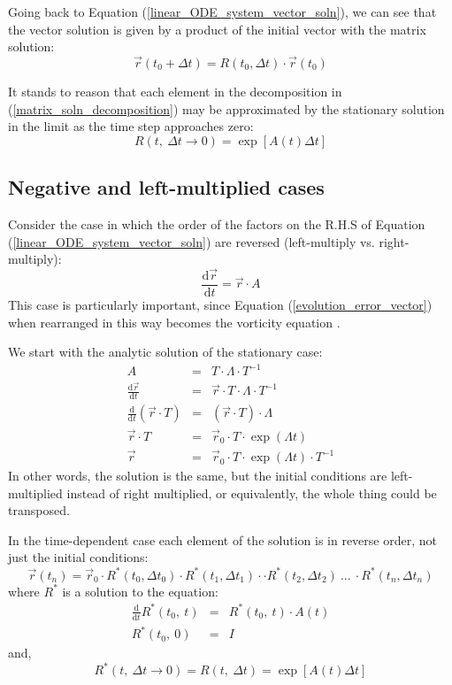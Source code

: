 \documentclass[11pt]{article}
\begin{document}
Going back to Equation (\ref{linear_ODE_system_vector_soln}), we can
see that the vector solution is given by a product of the initial vector with
the matrix solution:
\begin{equation}
\vec r(t_0+\Delta t)=R(t_0, \Delta t) \cdot \vec r(t_0)
\end{equation}

It stands to reason that each element in the decomposition in (\ref{matrix_soln_decomposition})
may be approximated by the stationary solution in the limit as the time step
approaches zero:
\begin{equation}
R(t, ~ \Delta t \rightarrow 0) = \exp \left [ A(t) \Delta t \right ]
\end{equation}

\subsection{Negative and left-multiplied cases}

Consider the case in which the order of the factors on the R.H.S of Equation 
(\ref{linear_ODE_system_vector_soln}) are reversed (left-multiply vs. right-multiply):
\begin{equation}
\frac{\mathrm d \vec r}{\mathrm d t} = \vec r \cdot A
\end{equation}
This case is particularly important, since Equation (\ref{evolution_error_vector})
when rearranged in this way becomes the vorticity equation \citep{Acheson1990}.

We start with the analytic solution of the stationary case:
\begin{eqnarray}
  A & = & T \cdot \Lambda \cdot T^{-1} \\
  \frac{\mathrm d \vec r}{\mathrm d t} & = & \vec r \cdot T \cdot \Lambda \cdot T^{-1} \\
  \frac{\mathrm d}{\mathrm d t} (\vec r \cdot T) & = & (\vec r \cdot T) \cdot \Lambda \\
  \vec r \cdot T & = & \vec r_0 \cdot T \cdot \exp (\Lambda t) \\
	\vec r & = & \vec r_0 \cdot T \cdot \exp (\Lambda t) \cdot T^{-1}
\end{eqnarray}
In other words, the solution is the same, but the initial conditions are
left-multiplied instead of right multiplied, or equivalently, the whole thing 
could be transposed.

In the time-dependent case each element of the solution is in reverse order,
not just the initial conditions:
\begin{equation}
	\vec r(t_n) = \vec r_0 \cdot R^*(t_0,\Delta t_0) \cdot R^*(t_1, \Delta t_1) \cdot \cdot R^*(t_2, \Delta t_2) ~ ... 
~ \cdot R^*(t_n,\Delta t_n)
\end{equation}
where $R^*$ is a solution to the equation:
\begin{eqnarray}
\frac{\mathrm d}{\mathrm d t}R^*(t_0,~t) & = & R^*(t_0, ~t) \cdot A(t) \\
R^*(t_0, ~ 0) & = & I
\end{eqnarray}
and,
\begin{equation}
R^*(t,~\Delta t \rightarrow 0) = R(t,~ \Delta t ) 
 = \exp \left [ A(t) \Delta t \right ]
\end{equation}
\end{document}
